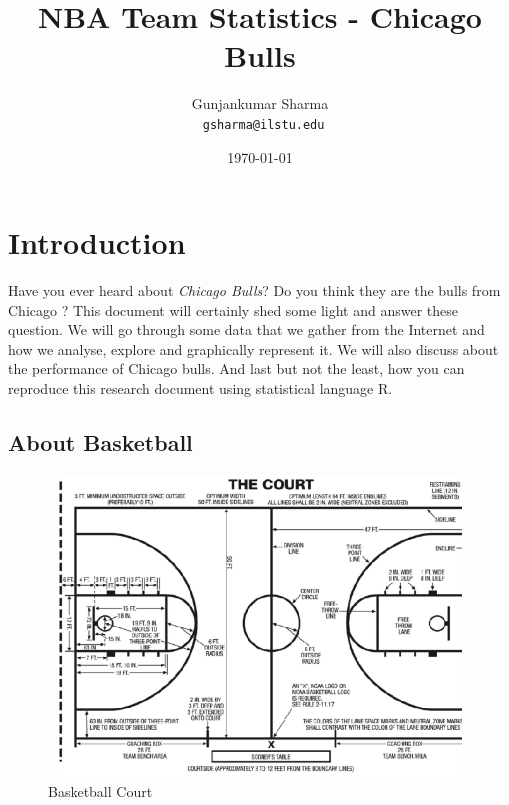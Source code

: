 \documentclass[a4paper]{article}
\begin{document}

\title { NBA Team Statistics - Chicago Bulls}
\author { Gunjankumar Sharma \\
\texttt{ gsharma@ilstu.edu}}
\date{\today} 
\maketitle
\tableofcontents

\vspace{4in}
\section{Introduction}
Have you ever heard about \textit{Chicago Bulls}? Do you think they are the bulls from Chicago ? This document will certainly shed some light and answer these question. We will go through some data that we gather from the Internet and how we analyse, explore and graphically represent it. We will also discuss about the performance of Chicago bulls. And last but not the least, how you can reproduce this research document using statistical language R.

\vspace{1cm}

\subsection{About Basketball}
\vspace{1cm}
\begin{figure}[ht]
\begin{center}
\includegraphics[width=14cm,height=8cm]{court.png}
\end{center}
\caption{Basketball Court}
\label{Img:court}
\end{figure}
\vspace{1cm}
\end{document}
